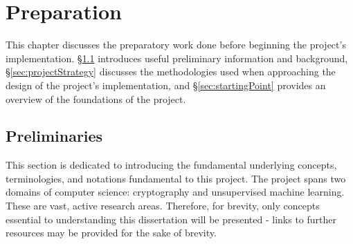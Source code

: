 \chapter{Preparation}
\label{chap:preparation}

\indent \indent
This chapter discusses the preparatory work done before beginning the project's implementation. §\ref{sec:preliminaries} introduces useful preliminary information and background, §\ref{sec:projectStrategy} discusses the methodologies used when approaching the design of the project's implementation, and §\ref{sec:startingPoint} provides an overview of the foundations of the project.

\section{Preliminaries}
\label{sec:preliminaries}
\setlength{\leftskip}{0.25cm}
\indent \indent
This section is dedicated to introducing the fundamental underlying concepts, terminologies, and notations fundamental to this project. The project spans two domains of computer science: cryptography and unsupervised machine learning. These are vast, active research areas. Therefore, for brevity, only concepts essential to understanding this dissertation will be presented - links to further resources may be provided for the sake of brevity.

\setlength{\leftskip}{0cm}

